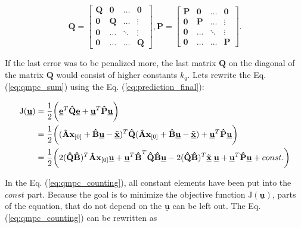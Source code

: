 \documentclass[a4paper,11pt,titlepage]{article}
\newcommand{\uvec}{\textbf{\underline{u}}}
\begin{document}
\begin{equation}
\label{eq:qmpc_weighting_matrices}
\textbf{\^Q} = \begin{bmatrix}
\textbf{Q} & \textbf{0} & \hdots & \textbf{0} \\
\textbf{0} & \textbf{Q} & \hdots & \vdots \\
\textbf{0} & \hdots & \ddots & \vdots \\
\textbf{0} & \hdots & \hdots & \textbf{Q}
\end{bmatrix},
\textbf{\^P} = \begin{bmatrix}
\textbf{P} & \textbf{0} & \hdots & \textbf{0} \\
\textbf{0} & \textbf{P} & \hdots & \vdots \\
\textbf{0} & \hdots & \ddots & \vdots \\
\textbf{0} & \hdots & \hdots & \textbf{P}
\end{bmatrix}.
\end{equation}

If the last error was to be penalized more, the last matrix $\textbf{Q}$ on the diagonal of the matrix $\textbf{\^Q}$ would consist of higher constants $k_q$. Lets rewrite the Eq. (\ref{eq:qmpc_sum}) using the Eq. (\ref{eq:prediction_final}):

\begin{equation}
\begin{split}
\label{eq:qmpc_counting}
\mathrm{J}(\underline{\textbf{u}}) 
&= \frac{1}{2}\bigg(\underline{\textbf{e}}^T 
\textbf{\^Q} \underline{\textbf{e}}+\underline{\textbf{u}}^T 
\textbf{\^P} \underline{\textbf{u}}\bigg)\\
&=\frac{1}{2}\bigg((\textbf{\^A}\textbf{x}_{[0]} + \textbf{\^B}	  \uvec-\underline{\textbf{\~x}})^T 
\textbf{\^Q}
(\textbf{\^A}\textbf{x}_{[0]} + \textbf{\^B}\uvec-\underline{\textbf{\~x}}) 
+\underline{\textbf{u}}^T 
\textbf{\^P} \underline{\textbf{u}}\bigg)\\
&=\frac{1}{2}\bigg(
2(\textbf{\^Q}\textbf{\^B})^T \textbf{\^A} \textbf{x}_{[0]} \underline{\textbf{u}}
+\uvec^T \textbf{\^B}^T\textbf{\^Q} \textbf{\^B}\uvec
-2(\textbf{\^Q}\textbf{\^B})^T \underline{\textbf{\~x}}\; \underline{\textbf{u}}
+\underline{\textbf{u}}^T 
\textbf{\^P} \underline{\textbf{u}}+const.\bigg)
\end{split}
\end{equation}

In the Eq. (\ref{eq:qmpc_counting}), all constant elements have been put into the $const$ part. Because the goal is to minimize the objective function $\mathrm{J}(\underline{\textbf{u}})$, parts of the equation, that do not depend on the $\underline{\textbf{u}}$ can be left out. The Eq. (\ref{eq:qmpc_counting}) can be rewritten as
\end{document}
